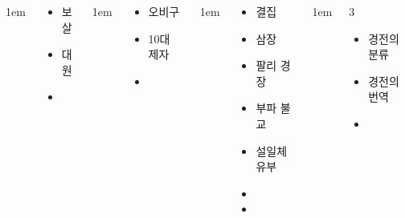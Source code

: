 \documentclass[	20pt, 
							a0paper, 
							landscape,
							margin=0mm, %
							innermargin=10mm,  		%
							blockverticalspace=4mm, %
							colspace=5mm, 
							subcolspace=0mm
							]{tikzposter}
\begin{document}
\begin{columns}
			{
					\setlength{\leftmargini}{4em}
					\setlength{\labelsep} {1em}
				\begin{LARGE}
					\begin{itemize}
					\item 보살
					\item 대원
					\item 
					\end{itemize}
				\end{LARGE}
			} %



			{
					\setlength{\leftmargini}{4em}
					\setlength{\labelsep} {1em}
				\begin{LARGE}
					\begin{itemize}
					\item 오비구 
					\item 10대 제자 
					\item 
					\end{itemize}
				\end{LARGE}
			} %


			{
					\setlength{\leftmargini}{4em}
					\setlength{\labelsep} {1em}
				\begin{LARGE}
					\begin{itemize}
					\item 결집
					\item 삼장
					\item 팔리 경장
					\item 부파 불교
					\item 설일체유부
					\item 
					\item 
					\end{itemize}
				\end{LARGE}
			} %



			{
					\setlength{\leftmargini}{3em}
					\setlength{\labelsep} {1em}
				\begin{LARGE}3
					\begin{itemize}
					\item 경전의 분류
					\item 경전의 번역
					\item 


\end{itemize}
\end{LARGE}}
\end{columns}
\end{document}
